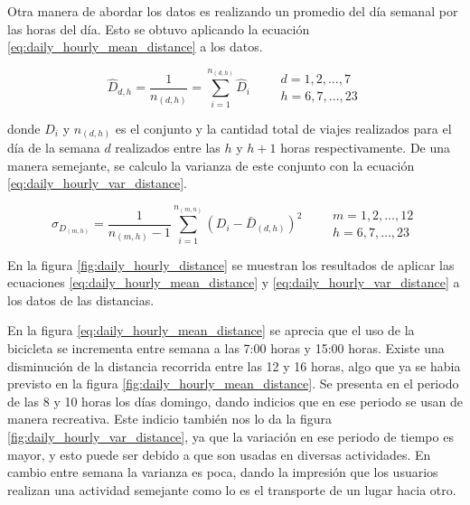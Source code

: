 Otra manera de abordar los datos es realizando un promedio del día semanal por las horas del día. Esto se obtuvo aplicando la ecuación \ref{eq:daily_hourly_mean_distance} a los datos.

\begin{equation}
    \hat{D}_{d,h} = \frac{1}{n_{(d,h)}} = \sum_{i=1}^{n_{(d,h)}} \hat{D}_{i} \qquad \begin{matrix}
        d=1,2,\dots,7 \\ h=6,7,\dots,23
    \end{matrix} \label{eq:daily_hourly_mean_distance}
\end{equation}

donde $D_i$ y $n_{(d,h)}$ es el conjunto y la cantidad total de viajes realizados para el día de la semana $d$ realizados entre las $h$ y $h+1$ horas respectivamente. De una manera semejante, se calculo la varianza de este conjunto con la ecuación \ref{eq:daily_hourly_var_distance}.

\begin{equation}
    \sigma_{D_{(m,h)}} = \frac{1}{n_{(m,h)}-1} \sum_{i=1}^{n_{(m,n)}} (D_i-\bar{D}_{(d,h)})^2 \qquad \begin{matrix}
        m=1,2,\dots,12 \\ h=6,7,\dots,23
    \end{matrix} \label{eq:daily_hourly_var_distance}
\end{equation}

En la figura \ref{fig:daily_hourly_distance} se muestran los resultados de aplicar las ecuaciones \ref{eq:daily_hourly_mean_distance} y \ref{eq:daily_hourly_var_distance} a los datos de las distancias.

En la figura \ref{eq:daily_hourly_mean_distance} se aprecia que el uso de la bicicleta se incrementa entre semana a las 7:00 horas y 15:00 horas. Existe una disminución de la distancia recorrida entre las 12 y 16 horas, algo que ya se habia previsto en la figura \ref{fig:daily_hourly_mean_distance}. Se presenta en el periodo de las 8 y 10 horas los días domingo, dando indicios que en ese periodo se usan de manera recreativa. Este indicio también nos lo da la figura \ref{fig:daily_hourly_var_distance}, ya que la variación en ese periodo de tiempo es mayor, y esto puede ser debido a que son usadas en diversas actividades. En cambio entre semana la varianza es poca, dando la impresión que los usuarios realizan una actividad semejante como lo es el transporte de un lugar hacia otro.

